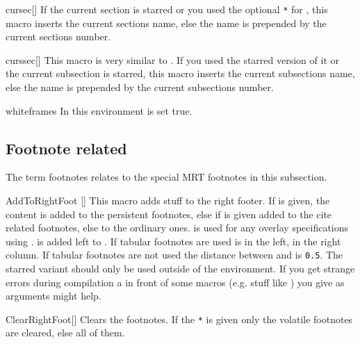 \begin{describemacro}{cursec}[\meta{*}]
  If the current section is starred or you used the optional \texttt{*} for
  , this macro inserts the current sections name, else the name is
  prepended by the current sections number.
\end{describemacro}

\begin{describemacro}{curssec}[\meta{*}]
  This macro is very similar to . If you used the starred version of
  it or the current subsection is starred, this macro inserts the current
  subsections name, else the name is prepended by the current subsections
  number.
\end{describemacro}

\begin{describeenv}{whiteframes}
  In this environment  is set true.
\end{describeenv}

\subsection{Footnote related}\label{sec:beam:macros:foot}
The term footnotes relates to the special MRT footnotes in this subsection.
\begin{describemacro}{AddToRightFoot}%
  [\meta{*}\meta{+}]
  This macro adds stuff to the right footer. If \meta{*} is given, the content
  is added to the persistent footnotes, else if \meta{+} is given added to the
  cite related footnotes, else to the ordinary ones.  is used for
  any overlay specifications using .  is added left to
  . If tabular footnotes are used  is in the left,
   in the right column. If tabular footnotes are not used the
  distance between  and  is \texttt{0.5}. The
  starred variant should only be used outside of the  environment. If
  you get strange errors during compilation a  in front of some
  macros (e.g. stuff like ) you give as arguments might help.
\end{describemacro}

\begin{describemacro}{ClearRightFoot}[\meta{*}]
  Clears the footnotes. If the \texttt{*} is given only the volatile footnotes
  are cleared, else all of them.
\end{describemacro}

